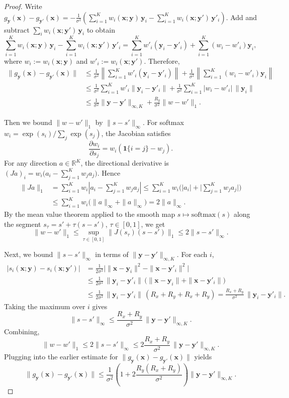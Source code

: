 \documentclass[12pt]{article}
\theoremstyle{definition} %
\newcommand{\R}{\mathbb{R}}
\newcommand{\y}{\bm y}
\newcommand{\x}{\bm x}
\begin{document}
\begin{proof}
Write
$
g_{\y}(\x)-g_{\y'}(\x)
=
-\frac{1}{\sigma^2}\left(\sum_{i=1}^K w_i(\x;\y)\,\y_i-\sum_{i=1}^K w_i(\x;\y')\,\y'_i\right)$.
Add and subtract $\sum_i w_i(\x;\y')\,\y_i$ to obtain
\[
\sum_{i=1}^K w_i(\x;\y)\,\y_i-\sum_{i=1}^K w_i(\x;\y')\,\y'_i
=
\sum_{i=1}^K w'_i(\y_i-\y'_i)
+\sum_{i=1}^K (w_i-w'_i)\y_i,
\]
where $w_i:=w_i(\x;\y)$ and $w'_i:=w_i(\x;\y')$.
Therefore,
\begin{align*}
\|g_{\y}(\x)-g_{\y'}(\x)\|
&\le \frac{1}{\sigma^2}\left\|\sum_{i=1}^K w'_i(\y_i-\y'_i)\right\|
      +\frac{1}{\sigma^2}\left\|\sum_{i=1}^K (w_i-w'_i)\y_i\right\|\\
&\le \frac{1}{\sigma^2}\sum_{i=1}^K w'_i\|\y_i-\y'_i\|
      +\frac{1}{\sigma^2}\sum_{i=1}^K |w_i-w'_i|\,\|\y_i\|\\
&\le \frac{1}{\sigma^2}\|\y-\y'\|_{\infty,K}
      +\frac{R_y}{\sigma^2}\|w-w'\|_1.
\end{align*}

Then we bound $\|w-w'\|_1$ by $\|s-s'\|_\infty$.
For softmax $w_i=\exp(s_i)/\sum_j \exp(s_j)$, the Jacobian satisfies
\[
\frac{\partial w_i}{\partial s_j}=w_i(\mathbf 1\{i=j\}-w_j).
\]
For any direction $a\in\R^K$, the directional derivative is
$
(Ja)_i = w_i\Big(a_i-\sum_{j=1}^K w_j a_j\Big)$.
Hence
\begin{align*}
\|Ja\|_1
&=\sum_{i=1}^K w_i\left|a_i-\sum_{j=1}^K w_j a_j\right|
\le \sum_{i=1}^K w_i\Big(|a_i|+\Big|\sum_{j=1}^K w_j a_j\Big|\Big)\\
&\le \sum_{i=1}^K w_i\big(\|a\|_\infty+\|a\|_\infty\big)
=2\|a\|_\infty.
\end{align*}
By the mean value theorem applied to the smooth map $s\mapsto \mathrm{softmax}(s)$ along the segment
$s_\tau = s' + \tau(s-s')$, $\tau\in[0,1]$, we get
\[
\|w-w'\|_1
\le \sup_{\tau\in[0,1]} \|J(s_\tau)(s-s')\|_1
\le 2\|s-s'\|_\infty.
\]

Next, we bound $\|s-s'\|_\infty$ in terms of $\|\y-\y'\|_{\infty,K}$.
For each $i$,
\begin{align*}
|s_i(\x;\y)-s_i(\x;\y')|
&=\frac{1}{2\sigma^2}\Big|\|\x-\y_i\|^2-\|\x-\y'_i\|^2\Big|\\
&\le \frac{1}{2\sigma^2}\,\|\y_i-\y'_i\|\,\big(\|\x-\y_i\|+\|\x-\y'_i\|\big)\\
&\le \frac{1}{2\sigma^2}\,\|\y_i-\y'_i\|\,(R_x+R_y+R_x+R_y)
= \frac{R_x+R_y}{\sigma^2}\,\|\y_i-\y'_i\|.
\end{align*}
Taking the maximum over $i$ gives
\[
\|s-s'\|_\infty \le \frac{R_x+R_y}{\sigma^2}\,\|\y-\y'\|_{\infty,K}.
\]
Combining,
\[
\|w-w'\|_1
\le 2\|s-s'\|_\infty
\le 2\frac{R_x+R_y}{\sigma^2}\,\|\y-\y'\|_{\infty,K}.
\]
Plugging into the earlier estimate for $\|g_{\y}(\x)-g_{\y'}(\x)\|$ yields
\[
\|g_{\y}(\x)-g_{\y'}(\x)\|
\le \frac{1}{\sigma^2}\left(1+2\frac{R_y(R_x+R_y)}{\sigma^2}\right)\|\y-\y'\|_{\infty,K}.
\]


\end{proof}
\end{document}

